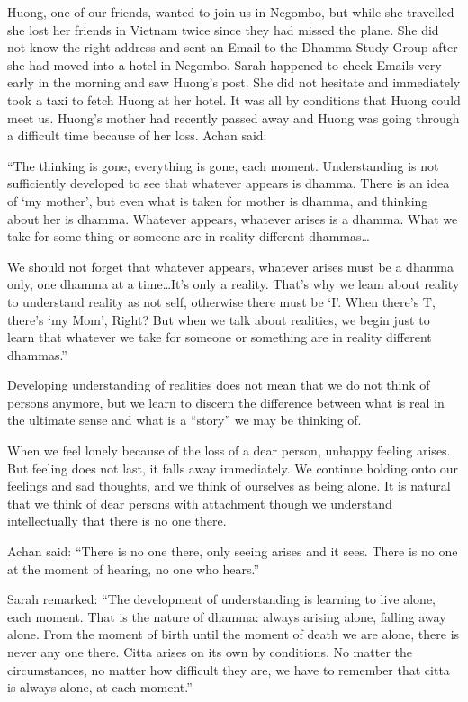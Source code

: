 Huong, one of our friends, wanted to join us in Negombo, but while she travelled she 
lost her friends in Vietnam twice since they had missed the plane. She did not know 
the right address and sent an Email to the Dhamma Study Group after she had moved 
into a hotel in Negombo. Sarah happened to check Emails very early in the morning 
and saw Huong’s post. She did not hesitate and immediately took a taxi to fetch Huong at her hotel. It was all by conditions that Huong could meet us. Huong’s mother 
had recently passed away and Huong was going through a difficult time because of 
her loss.  Achan said: 

“The thinking is gone, everything is gone, each moment. Understanding is not sufficiently developed to see that whatever appears is dhamma. There is an idea of ‘my 
mother’, but even what is taken for mother is dhamma, and thinking about her is 
dhamma. Whatever appears, whatever arises is a dhamma. What we take for some 
thing or someone are in reality different dhammas\ldots

We should not forget that whatever appears, whatever arises must be a dhamma only, 
one dhamma at a time\ldots It's only a reality. That's why we leam about reality to understand reality as not self, otherwise there must be `I'. When there's T, there's `my 
Mom', Right? But when we talk about realities, we begin just to learn that whatever 
we take for someone or something are in reality different dhammas.''

Developing understanding of realities does not mean that we do not think of persons 
anymore, but we learn to discern the difference between what is real in the ultimate 
sense and what is a ``story'' we may be thinking of. 

When we feel lonely because of the loss of a dear person, unhappy feeling arises. But 
feeling does not last, it falls away immediately. We continue holding onto our feelings and sad thoughts, and we think of ourselves as being alone. It is natural that we 
think of dear persons with attachment though we understand intellectually that there 
is no one there. 

 Achan said: ``There is no one there, only seeing arises and it sees. There is no one at 
the moment of hearing, no one who hears.''

Sarah remarked: ``The development of understanding is learning to live alone, each 
moment. That is the nature of dhamma: always arising alone, falling away alone. 
From the moment of birth until the moment of death we are alone, there is never any 
one there. Citta arises on its own by conditions. No matter the circumstances, no matter how difficult they are, we have to remember that citta is always alone, at each moment.'' 

